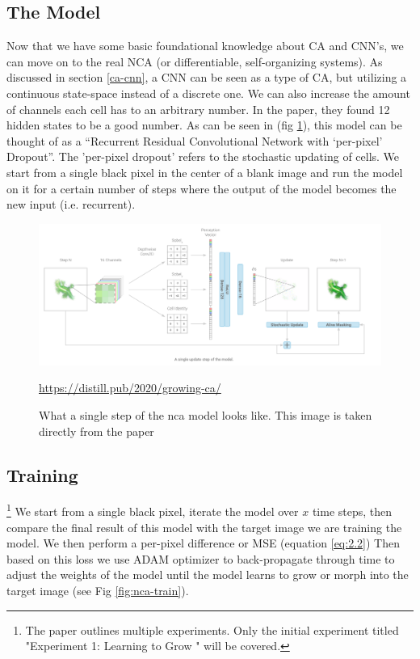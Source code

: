 \subsection{The Model}
Now that we have some basic foundational knowledge about CA and CNN's, we can move on to the real NCA (or differentiable, self-organizing systems). As discussed in section \ref{ca-cnn}, a CNN can be seen as a type of CA, but utilizing a continuous state-space instead of a discrete one. We can also increase the amount of channels each cell has to an arbitrary number. In the paper, they found 12 hidden states to be a good number. As can be seen in (fig \ref{fig:nca}), this model can be thought of as a “Recurrent Residual Convolutional Network with ‘per-pixel’ Dropout”. The 'per-pixel dropout' refers to the stochastic updating of cells. We start from a single black pixel in the center of a blank image and run the model on it for a certain number of steps where the output of the model becomes the new input (i.e. recurrent).
\begin{figure}[h]
	\includegraphics[width=1\textwidth]{../Figures/growing_nca.png}
	\centering
	\caption[NCA]{What a single step of the nca model looks like. This image is taken directly from the  paper \cite{growing_nca}} 
	\label{fig:nca}
	\url{https://distill.pub/2020/growing-ca/}
\end{figure}

\subsection{Training} \footnote{The paper outlines multiple experiments. Only the initial experiment titled "Experiment 1: Learning to Grow " will be covered.}
We start from a single black pixel, iterate the model over $x$ time steps, then compare the final result of this model with the target image we are training the model. We then perform a per-pixel difference or MSE (equation \ref{eq:2.2}) Then based on this loss we use ADAM optimizer to back-propagate through time to adjust the weights of the model until the model learns to grow or morph into the target image (see Fig \ref{fig:nca-train}).
	
